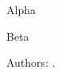 \documentclass{cntauth}
\begin{document}
\author[x]{Ann}{Alpha}
\author[y]{Bob}{Beta}
\begin{contrib}Authors: \the\value{nbauth}.\end{contrib}
\end{document}
